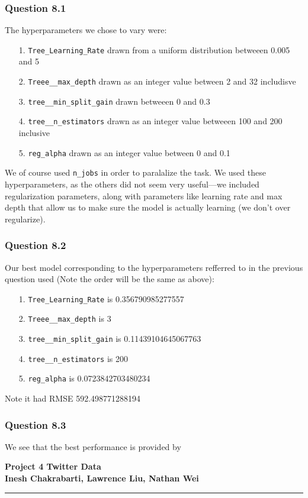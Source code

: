 \documentclass[11pt,letterpaper]{article}
\begin{document}
\subsubsection*{Question 8.1}
The hyperparameters we chose to vary were:
\begin{enumerate}
\item[1.] \texttt{Tree_Learning_Rate} drawn from a uniform distribution betweeen 0.005 and 5
\item[2.] \texttt{Treee__max_depth} drawn as an integer value between 2 and 32 includisve
\item[3.] \texttt{tree__min_split_gain} drawn betweeen 0 and 0.3 
\item[4.] \texttt{tree__n_estimators} drawn as an integer value betweeen 100 and 200 inclusive
\item[5.] \texttt{reg_alpha} drawn as an integer value between 0 and 0.1
\end{enumerate}
We of course used \texttt{n_jobs} in order to paralalize the task. We used these 
hyperparameters, as the others did not seem very useful—we included regularization 
parameters, along with parameters like learning rate and max depth that 
allow us to make sure the model is actually learning (we don't over regularize).
\subsubsection*{Question 8.2}
Our best model corresponding to the hyperparameters refferred to in the previous question 
used (Note the order will be the same as above):
\begin{enumerate}
\item[1.] \texttt{Tree_Learning_Rate} is 0.356790985277557
\item[2.] \texttt{Treee__max_depth} is 3
\item[3.] \texttt{tree__min_split_gain} is  0.11439104645067763
\item[4.] \texttt{tree__n_estimators} is 200
\item[5.] \texttt{reg_alpha} is 0.0723842703480234
\end{enumerate}
Note it had RMSE 592.498771288194

\subsubsection*{Question 8.3}
We see that the best performance is provided by 
\pagebreak
\begin{center}
    \begin{minipage}{10cm}
    	\begin{center}
    	\textbf{\large Project 4 Twitter Data}\\[0.1cm]
        \textbf{Inesh Chakrabarti, Lawrence Liu, Nathan Wei}\\[0.1cm]
    	\end{center}
    \end{minipage}\hfill
\end{center}
\rule{17cm}{0.1mm}




\end{document}
